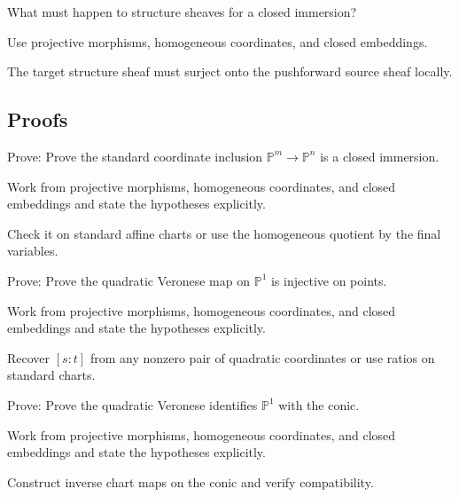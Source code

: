 \begin{exercise}\label{exr:vi38-expand-05}
What must happen to structure sheaves for a closed immersion?
\end{exercise}
\begin{hint}
Use projective morphisms, homogeneous coordinates, and closed embeddings.
\end{hint}
\begin{solution}
The target structure sheaf must surject onto the pushforward source sheaf locally.
\end{solution}

\subsection*{Proofs}

\begin{exercise}\label{exr:vi38-expand-06}
Prove: Prove the standard coordinate inclusion $\mathbb P^m\to\mathbb P^n$ is a closed immersion.
\end{exercise}
\begin{hint}
Work from projective morphisms, homogeneous coordinates, and closed embeddings and state the hypotheses explicitly.
\end{hint}
\begin{solution}
Check it on standard affine charts or use the homogeneous quotient by the final variables.
\end{solution}

\begin{exercise}\label{exr:vi38-expand-07}
Prove: Prove the quadratic Veronese map on $\mathbb P^1$ is injective on points.
\end{exercise}
\begin{hint}
Work from projective morphisms, homogeneous coordinates, and closed embeddings and state the hypotheses explicitly.
\end{hint}
\begin{solution}
Recover $[s:t]$ from any nonzero pair of quadratic coordinates or use ratios on standard charts.
\end{solution}

\begin{exercise}\label{exr:vi38-expand-08}
Prove: Prove the quadratic Veronese identifies $\mathbb P^1$ with the conic.
\end{exercise}
\begin{hint}
Work from projective morphisms, homogeneous coordinates, and closed embeddings and state the hypotheses explicitly.
\end{hint}
\begin{solution}
Construct inverse chart maps on the conic and verify compatibility.
\end{solution}

